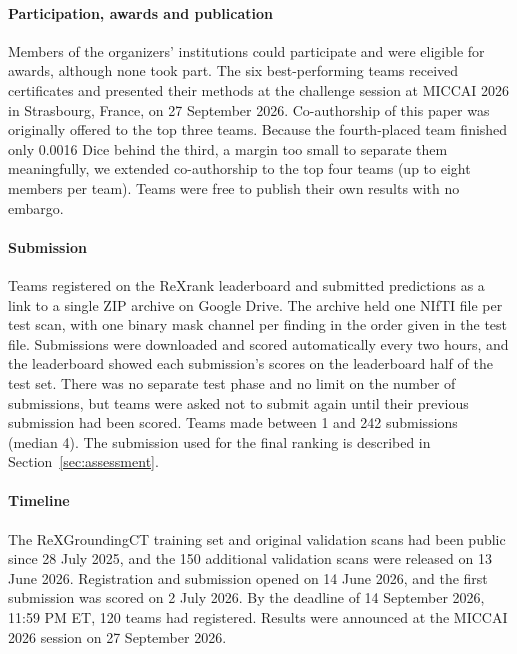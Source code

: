\documentclass[final,5p,times,twocolumn,authoryear,numafflabel]{elsarticle}
\begin{document}
\paragraph{Participation, awards and publication}
Members of the organizers' institutions could participate and were eligible
for awards, although none took part. The six best-performing teams received
certificates and presented their methods at the challenge session at MICCAI
2026 in Strasbourg, France, on 27 September 2026. Co-authorship of this
paper was originally offered to the top three teams. Because the fourth-placed
team finished only 0.0016 Dice behind the third, a margin too small to
separate them meaningfully, we extended co-authorship to the top four
teams (up to eight members per team). Teams were free to
publish their own results with no embargo.

\paragraph{Submission}
Teams registered on the ReXrank leaderboard and submitted predictions as a link
to a single ZIP archive on Google Drive. The archive held one NIfTI file per
test scan, with one binary mask channel per finding in the order given in the
test file. Submissions were downloaded and scored automatically every two
hours, and the leaderboard showed each submission's scores on the leaderboard half
of the test set. There was no separate test phase and no limit on the number
of submissions, but teams were asked not to submit again until their previous
submission had been scored. Teams made between 1 and 242
submissions (median 4). The submission used for the final ranking is
described in Section~\ref{sec:assessment}.

\paragraph{Timeline}
The ReXGroundingCT training set and original validation scans had been public
since 28 July 2025, and the 150 additional validation scans were
released on 13 June 2026. Registration and submission opened on
14 June 2026, and the first submission was scored on 2 July 2026.
By the deadline of 14 September 2026, 11:59 PM ET,
120 teams had registered. Results were announced at the MICCAI 2026 session on 27 September 2026.
\end{document}

